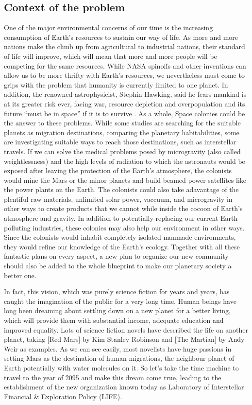 \subsection{Context of the problem}
\indent
One of the major environmental concerns of our time is the increasing consumption of Earth's resources to sustain our way of life. As more and more nations make the climb up from agricultural to industrial nations, their standard of life will improve, which will mean that more and more people will be competing for the same resources. While NASA spinoffs and other inventions can allow us to be more thrifty with Earth's resources, we nevertheless must come to grips with the problem that humanity is currently limited to one planet. In addition, the renowned astrophysicist, Stephin Hawking, said he fears mankind is at its greater risk ever, facing war, resource depletion and overpopulation and its future ``must be in space'' if it is to survive \cite{telegraph}. As a whole, Space colonies could be the answer to these problems. While some studies are searching for the suitable planets as migration destinations, comparing the planetary habitabilities\cite{Grenfell:2009imba}, some are investigating suitable ways to reach those destinations, such as interstellar travels\cite{Crawford:2011ggba}. If we can solve the medical problems posed by microgravity (also called weightlessness) and the high levels of radiation to which the astronauts would be exposed after leaving the protection of the Earth's atmosphere, the colonists would mine the Mars or the minor planets and build beamed power satellites like the power plants on the Earth\cite{nasa}. The colonists could also take adavantage of the plentiful raw materials, unlimited solar power, vaccuum, and microgravity in other ways to create products that we cannot while inside the cocoon of Earth's atmosphere and gravity. In addition to potentially replacing our current Earth-polluting industries, these colonies may also help our environment in other ways. Since the colonists would inhabit completely isolated manmade environments, they would refine our knowledge of the Earth's ecology. Together with all these fantastic plans on every aspect, a new plan to organize our new community should also be added to the whole blueprint to make our planetary society a better one.

In fact, this vision, which was purely science fiction for years and years, has caught the imagination of the public for a very long time. Human beings have long been dreaming about settling down on a new planet for a better living, which will provide them with substantial income, adequate education and improved equality. Lots of science fiction novels have described the life on another planet, taking [Red Mars] by Kim Stanley Robinson and [The Martian] by Andy Weir as examples. As we can see easily, most novelists have huge passions in setting Mars as the destination of human migrations, the neighbour planet of Earth potentially with water molecules on it. So let's take the time machine to travel to the year of 2095 and make this dream come true, leading to the establishment of the new organization known today as Laboratory of Interstellar Financial \& Exploration Policy (LIFE). 

